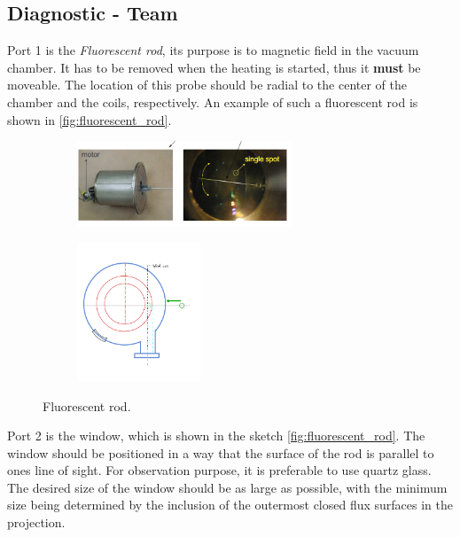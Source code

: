 \subsection{Diagnostic - Team}


Port 1 is the \emph{Fluorescent rod}, its purpose is to magnetic field in the vacuum chamber.
It has to be removed when the heating is started, thus it \textbf{must} be moveable.
The location of this probe should be radial to the center of the chamber and the coils, respectively.
An example of such a fluorescent rod is shown in \autoref{fig:fluorescent_rod}.

\begin{figure}[H]
    \centering
    \begin{subfigure}[b]{1\textwidth}
        \centering
        \includegraphics[width=0.7\textwidth]{sections/imges/ports/fluorescent_rod.png}
        \label{fig:fluorescent_rod}
    \end{subfigure}
    \hfill
    \begin{subfigure}[b]{1\textwidth}
        \centering
        \includegraphics[width=0.4\textwidth]{sections/imges/ports/Flurescent_rod_new_sketch.jpeg}
        \label{fig:fluorescent_rod_sketch}
    \end{subfigure}
    \caption{Fluorescent rod.}
\end{figure}


Port 2 is the window, which is shown in the sketch \autoref{fig:fluorescent_rod}.
The window should be positioned in a way that the surface of the rod is parallel to ones line of sight.
For observation purpose, it is preferable to use quartz glass.
The desired size of the window should be as large as possible, with the minimum size being determined by the inclusion of the outermost closed flux surfaces in the projection.

